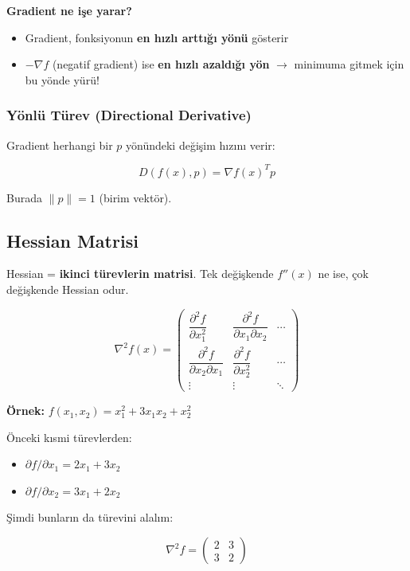\documentclass[12pt,a4paper]{article}
\theoremstyle{definition}
\theoremstyle{remark}
\begin{document}
\textbf{Gradient ne i\c{s}e yarar?}
\begin{itemize}
    \item Gradient, fonksiyonun \textbf{en h{\i}zl{\i} artt{\i}\u{g}{\i} y\"on\"u} g\"osterir
    \item $-\nabla f$ (negatif gradient) ise \textbf{en h{\i}zl{\i} azald{\i}\u{g}{\i} y\"on} $\to$ minimuma gitmek i\c{c}in bu y\"onde y\"ur\"u!
\end{itemize}

\subsubsection{Y\"onl\"u T\"urev (Directional Derivative)}

Gradient herhangi bir $p$ y\"on\"undeki de\u{g}i\c{s}im h{\i}z{\i}n{\i} verir:

\[
D(f(x), p) = \nabla f(x)^T p
\]

Burada $\|p\| = 1$ (birim vekt\"or).

\subsection{Hessian Matrisi}

Hessian = \textbf{ikinci t\"urevlerin matrisi}. Tek de\u{g}i\c{s}kende $f''(x)$ ne ise, \c{c}ok de\u{g}i\c{s}kende Hessian odur.

\[
\nabla^2 f(x) = \begin{pmatrix} \dfrac{\partial^2 f}{\partial x_1^2} & \dfrac{\partial^2 f}{\partial x_1 \partial x_2} & \cdots \\[8pt] \dfrac{\partial^2 f}{\partial x_2 \partial x_1} & \dfrac{\partial^2 f}{\partial x_2^2} & \cdots \\[8pt] \vdots & \vdots & \ddots \end{pmatrix}
\]

\textbf{\"Ornek:} $f(x_1, x_2) = x_1^2 + 3x_1 x_2 + x_2^2$

\"Onceki k{\i}smi t\"urevlerden:
\begin{itemize}
    \item $\partial f / \partial x_1 = 2x_1 + 3x_2$
    \item $\partial f / \partial x_2 = 3x_1 + 2x_2$
\end{itemize}

\c{S}imdi bunlar{\i}n da t\"urevini alal{\i}m:

\[
\nabla^2 f = \begin{pmatrix} 2 & 3 \\ 3 & 2 \end{pmatrix}
\]
\end{document}
